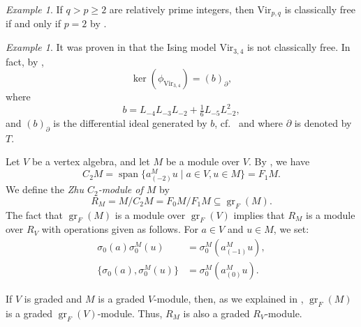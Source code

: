 \documentclass[a4paper, 12pt, reqno]{amsart}
\theoremstyle{remark}
\newtheorem{example}[theorem]{Example}
\DeclareMathOperator{\gr}{gr}
\DeclareMathOperator{\vspan}{span}
\newcommand{\Vir}{{\mathrm{Vir}}}
\begin{document}
\begin{example}
  \label{exa:8}
  If $q > p \ge 2$ are relatively prime integers, then $\Vir_{p, q}$ is classically free if and only if $p = 2$ by \cite{van_ekeren_chiral_2021}.
\end{example}

\begin{example}
  \label{exa:9}
  It was proven in \cite{andrews_singular_2022} that the Ising model $\Vir_{3, 4}$ is not classically free.
  In fact, by \cite[Theorem 2]{andrews_singular_2022},
  \begin{equation*}
    \ker(\phi_{\Vir_{3, 4}}) = (b)_\partial,
  \end{equation*}
  where
  \begin{equation*}
    b = L_{-4}L_{-3}L_{-2} + \tfrac{1}{6}L_{-5}L_{-2}^2,
  \end{equation*}
  and $(b)_\partial$ is the differential ideal generated by $b$, cf.\  and  where $\partial$ is denoted by $T$.
\end{example}

Let $V$ be a vertex algebra, and let $M$ be a module over $V$.
By \cite[Lemma 2.9]{li_abelianizing_2005}, we have
\begin{equation*}
  C_2M = \vspan\{a^M_{(-2)}u \mid a \in V, u \in M\} = F_1M.
\end{equation*}
We define the \emph{Zhu $C_2$-module of $M$} by
\begin{equation*}
  R_M = M/C_2M = F_0M/F_1M \subseteq \gr_F(M).
\end{equation*}
The fact that $\gr_F(M)$ is a module over $\gr_F(V)$ implies that $R_M$ is a module over $R_V$ with operations given as follows.
For $a \in V$ and $u \in M$, we set:
\begin{align*}
  \sigma_0(a)\sigma^M_0(u) &= \sigma^M_0(a^M_{(-1)}u), \\
  \{\sigma_0(a), \sigma^M_0(u)\} &= \sigma^M_0(a^M_{(0)}u).
\end{align*}

If $V$ is graded and $M$ is a graded $V$-module, then, as we explained in , $\gr_F(M)$ is a graded $\gr_F(V)$-module.
Thus, $R_M$ is also a graded $R_V$-module.
\end{document}

